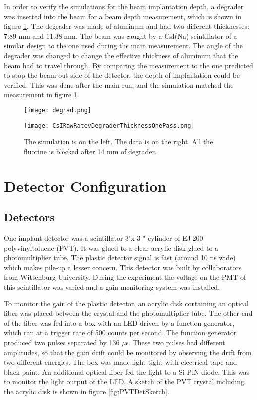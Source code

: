 \documentclass[../MaxHughesThesis.tex]{subfiles}
\begin{document}
In order to verify the simulations for the beam implantation depth, a degrader was inserted into the beam for a beam depth measurement, which is shown in figure \ref{fig:degraderdata}.
The degrader was made of aluminum and had two different thicknesses: 7.89 mm and 11.38 mm. 
The beam was caught by a CsI(Na) scintillator of a similar design to the one used during the main measurement.
The angle of the degrader was changed to change the effective thickness of aluminum that the beam had to travel through. 
By comparing the measurement to the one predicted to stop the beam out side of the detector, the depth of implantation could be verified. 
This was done after the main run, and the simulation matched the measurement in figure \ref{fig:degraderdata}.

\begin{figure}
    \centering
    \begin{minipage}{0.50\textwidth}
	\centerline{\texttt{[image: degrad.png]}}
    \end{minipage}\hfill
    \begin{minipage}{0.50\textwidth}
	\centerline{\texttt{[image: CsIRawRatevDegraderThicknessOnePass.png]}}
    \end{minipage}
	\caption{The simulation is on the left.
		 The data is on the right.
		 All the fluorine is blocked after 14 mm of degrader.}
	\label{fig:degraderdata}
\end{figure}


\section{Detector Configuration}

\subsection{Detectors}
One implant detector was a scintillator 3"\diameter x  3 " cylinder of EJ-200 polyvinyltoluene (PVT).
It was glued to a clear acrylic disk glued to a photomultiplier tube.
The plastic detector signal is fast (around 10 ns wide) which makes pile-up a lesser concern.
This detector was built by collaborators from Wittenburg University.
During the experiment the voltage on the PMT of this scintillator was varied and a gain monitoring system was installed.

To monitor the gain of the plastic detector, an acrylic disk containing an optical fiber was placed between the crystal and the photomultiplier tube. 
The other end of the fiber was fed into a box with an LED driven by a function generator, which ran at a trigger rate of 500 counts per second. 
The function generator produced two pulses separated by 136 $\mu$s.
These two pulses had different amplitudes, so that the gain drift could be monitored by observing the drift from two different energies.
The box was made light-tight with electrical tape and black paint.
An additional optical fiber fed the light to a Si PIN diode.
This was to monitor the light output of the LED.
A sketch of the PVT crystal including the acrylic disk is shown in figure \ref{fig:PVTDetSketch}.
\end{document}
